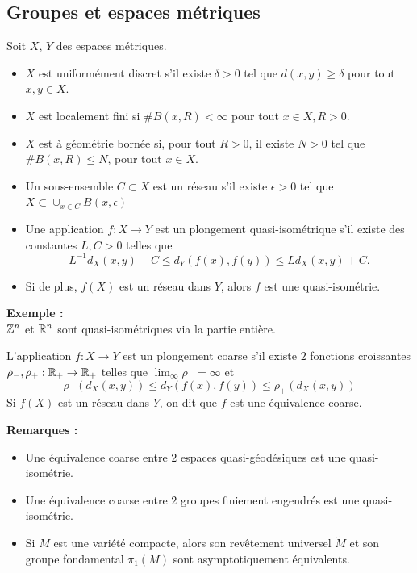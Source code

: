 \documentclass{beamer}
\begin{document}
\subsection{Groupes et espaces métriques}

\begin{frame}
Soit $X$, $Y$ des espaces métriques.\\
\begin{definition}
\begin{itemize}
\item $X$ est uniformément discret s'il existe $\delta>0$ tel que $d(x,y)\geq\delta$ pour tout $x,y\in X$. 
\item $X$ est localement fini si $\# B(x,R)<\infty$ pour tout $x\in X,R>0$.
\item $X$ est à géométrie bornée si, pour tout $R>0$, il existe $N>0$ tel que $\# B(x,R)\leq N$, pour tout $x\in X$.
\end{itemize}
\end{definition}
\end{frame}
 
\begin{frame}
\begin{definition}
\begin{itemize}
\item Un sous-ensemble $C\subset X$ est un réseau s'il existe $\epsilon>0$ tel que $X\subset \cup_{x\in C} B(x,\epsilon)$ 
\item Une application $f : X\rightarrow Y$ est un plongement quasi-isométrique s'il existe des constantes $L,C>0$ telles que 
\[L^{-1} d_X(x,y)-C\leq d_Y(f(x),f(y))\leq L d_X(x,y)+C .\]
\item Si de plus, $f(X)$ est un réseau dans $Y$, alors $f$ est une quasi-isométrie.
\end{itemize}
\end{definition}
\textbf{Exemple :}\\
$\mathbb Z^n$ et $\mathbb R^n$ sont quasi-isométriques via la partie entière.
\end{frame}

\begin{frame}
\begin{definition}
L'application $f : X\rightarrow Y$ est un plongement coarse s'il existe $2$ fonctions croissantes $\rho_-,\rho_+ : \mathbb R_+\rightarrow \mathbb R_+$ telles que $\lim_{\infty} \rho_-=\infty$ et 
\[\rho_-(d_X(x,y))\leq d_Y(f(x),f(y))\leq \rho_+(d_X(x,y))\]
Si $f(X)$ est un réseau dans $Y$, on dit que $f$ est une équivalence coarse.
\end{definition}
\textbf{Remarques :}
\begin{itemize}
\item Une équivalence coarse entre $2$ espaces quasi-géodésiques est une quasi-isométrie.
\item Une équivalence coarse entre $2$ groupes finiement engendrés est une quasi-isométrie.
\item Si $M$ est une variété compacte, alors son revêtement universel $\tilde M$ et son groupe fondamental $\pi_1(M)$ sont asymptotiquement équivalents. 
\end{itemize}
\end{frame}
\end{document}
